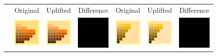 \begin{figure}[t]
	\centering
	{\sffamily
		\setlength\tabcolsep{0.5pt}
		\begin{tabular}{ccccccc}
			&Original& Uplifted & Difference &\quad Original & Uplifted & Difference
			\vspace{1em} \\ 
			\raisebox{0.4cm}[0pt][0pt]{\parbox[c][0pt][c]{0cm}{\hspace{-1.5em}\\[20pt]}\par}
			&\includegraphics[width=.155\linewidth]{img/results_uplift_page04_originalFL3.png}
			&
			\includegraphics[width=.155\linewidth]{img/results_uplift_page04_sigmoidFL3.png}
			& 
			\includegraphics[width=.155\linewidth]{img/toDelete.png}
			&\quad
			\includegraphics[width=.155\linewidth]{img/results_uplift_page10_originalFL11.png}
			&
			\includegraphics[width=.155\linewidth]{img/results_uplift_page10_sigmoidFL11.png}
			&
			\includegraphics[width=.155\linewidth]{img/toDelete.png}

\end{tabular}}
\end{figure}
